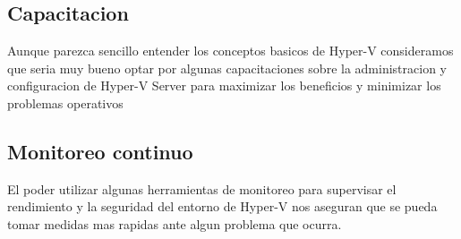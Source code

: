 \documentclass[journal]{IEEEtran}
\begin{document}
\subsection{Capacitacion}
Aunque parezca sencillo entender los conceptos basicos de Hyper-V consideramos que seria muy bueno optar por algunas capacitaciones sobre la administracion y configuracion de Hyper-V Server para maximizar los beneficios y minimizar los problemas operativos
\subsection{Monitoreo continuo}
El poder utilizar algunas herramientas de monitoreo para supervisar el rendimiento y la seguridad del entorno de Hyper-V nos aseguran que se pueda tomar medidas mas rapidas ante algun problema que ocurra.

\end{document}
